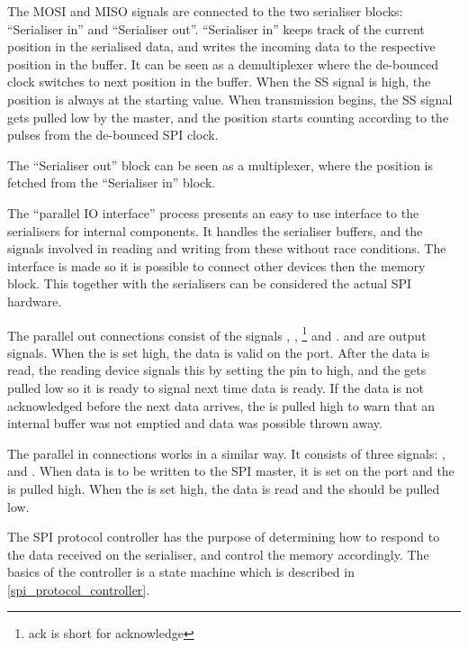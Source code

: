 The MOSI and MISO signals are connected to the two serialiser blocks: ``Serialiser in'' and ``Serialiser out''. ``Serialiser in'' keeps track of the current position in the serialised data, and writes the incoming data to the respective position in the buffer. It can be seen as a demultiplexer where the de-bounced clock switches to next position in the buffer. When the SS signal is high, the position is always at the starting value. When transmission begins, the SS signal gets pulled low by the master, and the position starts counting according to the pulses from the de-bounced SPI clock. 

The ``Serialiser out'' block can be seen as a multiplexer, where the position is fetched from the ``Serialiser in'' block.

The ``parallel IO interface'' process presents an easy to use interface to the serialisers for internal components. It handles the serialiser buffers, and the signals involved in reading and writing from these without race conditions. The interface is made so it is possible to connect other devices then the memory block. This together with the serialisers can be considered the actual SPI hardware. 

The parallel out connections consist of the signals , , \footnote{ack is short for acknowledge} and .  and  are output signals. When the  is set high, the data is valid on the  port. After the data is read, the reading device signals this by setting the  pin to high, and the  gets pulled low so it is ready to signal next time data is ready. If the data is not acknowledged before the next data arrives, the  is pulled high to warn that an internal buffer was not emptied and data was possible thrown away.

The parallel in connections works in a similar way. It consists of three signals: ,  and . When data is to be written to the SPI master, it is set on the  port and the  is pulled high. When the  is set high, the data is read and the  should be pulled low.

The SPI protocol controller has the purpose of determining how to respond to the data received on the serialiser, and control the memory accordingly. The basics of the controller is a state machine which is described in \ref{spi_protocol_controller}.

